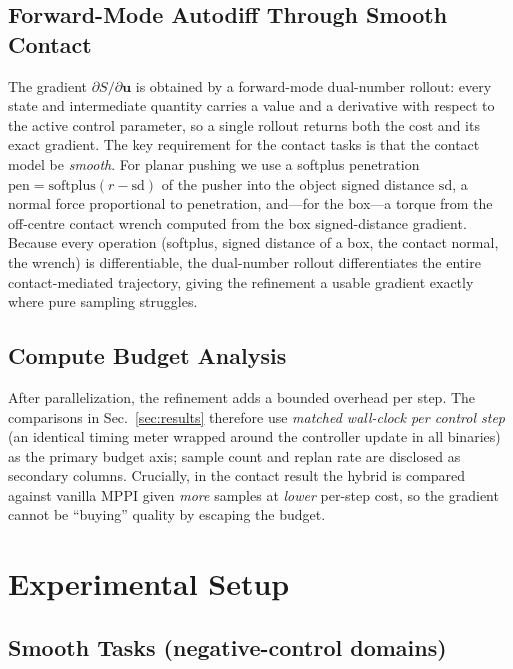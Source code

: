 \documentclass[journal]{IEEEtran}
\begin{document}
\subsection{Forward-Mode Autodiff Through Smooth Contact}
\label{sec:autodiff_contact}

The gradient $\partial S/\partial \mathbf{u}$ is obtained by a forward-mode
dual-number rollout: every state and intermediate quantity carries a value and a
derivative with respect to the active control parameter, so a single rollout
returns both the cost and its exact gradient. The key requirement for the
contact tasks is that the contact model be \emph{smooth}. For planar pushing we
use a softplus penetration $\mathrm{pen} = \mathrm{softplus}(r - \mathrm{sd})$ of
the pusher into the object signed distance $\mathrm{sd}$, a normal force
proportional to penetration, and---for the box---a torque from the off-centre
contact wrench computed from the box signed-distance gradient. Because every
operation (softplus, signed distance of a box, the contact normal, the wrench)
is differentiable, the dual-number rollout differentiates the entire
contact-mediated trajectory, giving the refinement a usable gradient exactly
where pure sampling struggles.

\subsection{Compute Budget Analysis}
\label{sec:budget}

After parallelization, the refinement adds a bounded overhead per step. The
comparisons in Sec.~\ref{sec:results} therefore use \emph{matched wall-clock per
control step} (an identical timing meter wrapped around the controller update in
all binaries) as the primary budget axis; sample count and replan rate are
disclosed as secondary columns. Crucially, in the contact result the hybrid is
compared against vanilla MPPI given \emph{more} samples at \emph{lower} per-step
cost, so the gradient cannot be ``buying'' quality by escaping the budget.

\section{Experimental Setup}
\label{sec:experiments}

\subsection{Smooth Tasks (negative-control domains)}
\end{document}
